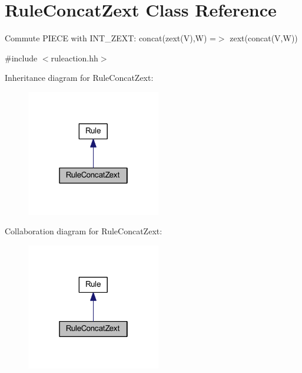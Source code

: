 \hypertarget{class_rule_concat_zext}{}\section{Rule\+Concat\+Zext Class Reference}
\label{class_rule_concat_zext}


Commute P\+I\+E\+CE with I\+N\+T\+\_\+\+Z\+E\+XT\+: {\ttfamily concat(zext(\+V),\+W) =$>$ zext(concat(\+V,\+W))}  




{\ttfamily \#include $<$ruleaction.\+hh$>$}



Inheritance diagram for Rule\+Concat\+Zext\+:
\nopagebreak
\begin{figure}[H]
\begin{center}
\leavevmode
\includegraphics[width=166pt]{class_rule_concat_zext__inherit__graph}
\end{center}
\end{figure}


Collaboration diagram for Rule\+Concat\+Zext\+:
\nopagebreak
\begin{figure}[H]
\begin{center}
\leavevmode
\includegraphics[width=166pt]{class_rule_concat_zext__coll__graph}
\end{center}
\end{figure}
